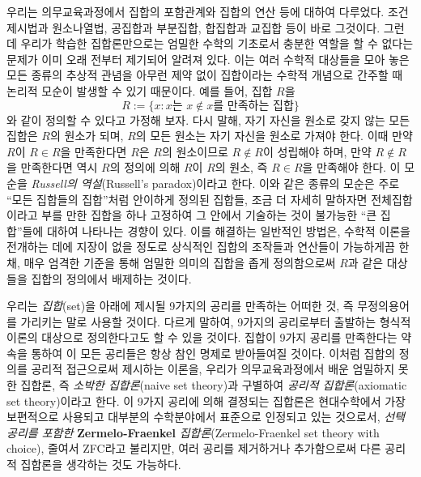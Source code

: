 \documentclass{../../large}
\begin{document}
우리는 의무교육과정에서 집합의 포함관계와 집합의 연산 등에 대하여 다루었다.
조건제시법과 원소나열법, 공집합과 부분집합, 합집합과 교집합 등이 바로 그것이다.
그런데 우리가 학습한 집합론만으로는 엄밀한 수학의 기초로서 충분한 역할을 할 수 없다는 문제가 이미 오래 전부터 제기되어 알려져 있다.
이는 여러 수학적 대상들을 모아 놓은 모든 종류의 추상적 관념을 아무런 제약 없이 집합이라는 수학적 개념으로 간주할 때 논리적 모순이 발생할 수 있기 때문이다.
예를 들어, 집합 $R$을
\[R:=\{x:\text{$x$는 $x\notin x$를 만족하는 집합}\}\]
와 같이 정의할 수 있다고 가정해 보자.
다시 말해, 자기 자신을 원소로 갖지 않는 모든 집합은 $R$의 원소가 되며, $R$의 모든 원소는 자기 자신을 원소로 가져야 한다.
이때 만약 $R$이 $R\in R$을 만족한다면 $R$은 $R$의 원소이므로 $R\notin R$이 성립해야 하며, 만약 $R\notin R$을 만족한다면 역시 $R$의 정의에 의해 $R$이 $R$의 원소, 즉 $R\in R$을 만족해야 한다.
이 모순을 \emph{Russell의 역설}(Russell's paradox)이라고 한다.
이와 같은 종류의 모순은 주로 ``모든 집합들의 집합''처럼 안이하게 정의된 집합들, 조금 더 자세히 말하자면 전체집합이라고 부를 만한 집합을 하나 고정하여 그 안에서 기술하는 것이 불가능한 ``큰 집합''들에 대하여 나타나는 경향이 있다.
이를 해결하는 일반적인 방법은, 수학적 이론을 전개하는 데에 지장이 없을 정도로 상식적인 집합의 조작들과 연산들이 가능하게끔 한 채, 매우 엄격한 기준을 통해 엄밀한 의미의 집합을 좁게 정의함으로써 $R$과 같은 대상들을 집합의 정의에서 배제하는 것이다.

우리는 \emph{집합}(set)을 아래에 제시될 9가지의 공리를 만족하는 어떠한 것, 즉 무정의용어를 가리키는 말로 사용할 것이다.
다르게 말하여, 9가지의 공리로부터 출발하는 형식적 이론의 대상으로 정의한다고도 할 수 있을 것이다.
집합이 9가지 공리를 만족한다는 약속을 통하여 이 모든 공리들은 항상 참인 명제로 받아들여질 것이다.
이처럼 집합의 정의를 공리적 접근으로써 제시하는 이론을, 우리가 의무교육과정에서 배운 엄밀하지 못한 집합론, 즉 \emph{소박한 집합론}(naive set theory)과 구별하여 \emph{공리적 집합론}(axiomatic set theory)이라고 한다.
이 9가지 공리에 의해 결정되는 집합론은 현대수학에서 가장 보편적으로 사용되고 대부분의 수학분야에서 표준으로 인정되고 있는 것으로서, \emph{선택공리를 포함한 }\textbf{Zermelo-Fraenkel}\emph{ 집합론}(Zermelo-Fraenkel set theory with choice), 줄여서 ZFC라고 불리지만, 여러 공리를 제거하거나 추가함으로써 다른 공리적 집합론을 생각하는 것도 가능하다.
\end{document}
